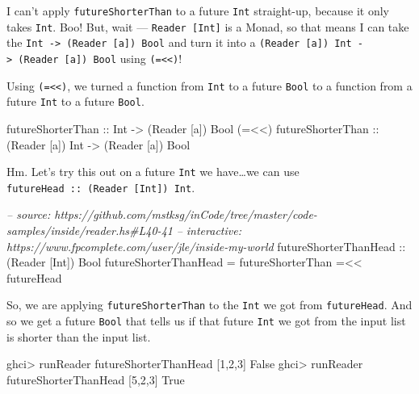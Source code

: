 \documentclass[]{article}
\newenvironment{Shaded}{\begin{snugshade}}{\end{snugshade}}
\newcommand{\CommentTok}[1]{\textcolor[rgb]{0.56,0.35,0.01}{\textit{#1}}}
\newcommand{\DataTypeTok}[1]{\textcolor[rgb]{0.13,0.29,0.53}{#1}}
\newcommand{\DecValTok}[1]{\textcolor[rgb]{0.00,0.00,0.81}{#1}}
\newcommand{\FunctionTok}[1]{\textcolor[rgb]{0.00,0.00,0.00}{#1}}
\newcommand{\NormalTok}[1]{#1}
\newcommand{\OtherTok}[1]{\textcolor[rgb]{0.56,0.35,0.01}{#1}}
\begin{document}
I can't apply \texttt{futureShorterThan} to a future \texttt{Int} straight-up,
because it only takes \texttt{Int}. Boo! But, wait ---
\texttt{Reader\ {[}Int{]}} is a Monad, so that means I can take the
\texttt{Int\ -\textgreater{}\ (Reader\ {[}a{]})\ Bool} and turn it into a
\texttt{(Reader\ {[}a{]})\ Int\ -\textgreater{}\ (Reader\ {[}a{]})\ Bool} using
\texttt{(=\textless{}\textless{})}!

Using \texttt{(=\textless{}\textless{})}, we turned a function from \texttt{Int}
to a future \texttt{Bool} to a function from a future \texttt{Int} to a future
\texttt{Bool}.

\begin{Shaded}
\begin{Highlighting}[]
\OtherTok{futureShorterThan       ::} \DataTypeTok{Int}              \OtherTok{->}\NormalTok{ (}\DataTypeTok{Reader}\NormalTok{ [a]) }\DataTypeTok{Bool}
\NormalTok{(}\FunctionTok{=<<}\NormalTok{)}\OtherTok{ futureShorterThan ::}\NormalTok{ (}\DataTypeTok{Reader}\NormalTok{ [a]) }\DataTypeTok{Int} \OtherTok{->}\NormalTok{ (}\DataTypeTok{Reader}\NormalTok{ [a]) }\DataTypeTok{Bool}
\end{Highlighting}
\end{Shaded}

Hm. Let's try this out on a future \texttt{Int} we have\ldots{}we can use
\texttt{futureHead\ ::\ (Reader\ {[}Int{]})\ Int}.

\begin{Shaded}
\begin{Highlighting}[]
\CommentTok{-- source: https://github.com/mstksg/inCode/tree/master/code-samples/inside/reader.hs#L40-41}
\CommentTok{-- interactive: https://www.fpcomplete.com/user/jle/inside-my-world}
\OtherTok{futureShorterThanHead ::}\NormalTok{ (}\DataTypeTok{Reader}\NormalTok{ [}\DataTypeTok{Int}\NormalTok{]) }\DataTypeTok{Bool}
\NormalTok{futureShorterThanHead }\FunctionTok{=}\NormalTok{ futureShorterThan }\FunctionTok{=<<}\NormalTok{ futureHead}
\end{Highlighting}
\end{Shaded}

So, we are applying \texttt{futureShorterThan} to the \texttt{Int} we got from
\texttt{futureHead}. And so we get a future \texttt{Bool} that tells us if that
future \texttt{Int} we got from the input list is shorter than the input list.

\begin{Shaded}
\begin{Highlighting}[]
\NormalTok{ghci}\FunctionTok{>}\NormalTok{ runReader futureShorterThanHead [}\DecValTok{1}\NormalTok{,}\DecValTok{2}\NormalTok{,}\DecValTok{3}\NormalTok{]}
\DataTypeTok{False}
\NormalTok{ghci}\FunctionTok{>}\NormalTok{ runReader futureShorterThanHead [}\DecValTok{5}\NormalTok{,}\DecValTok{2}\NormalTok{,}\DecValTok{3}\NormalTok{]}
\DataTypeTok{True}
\end{Highlighting}
\end{Shaded}
\end{document}
